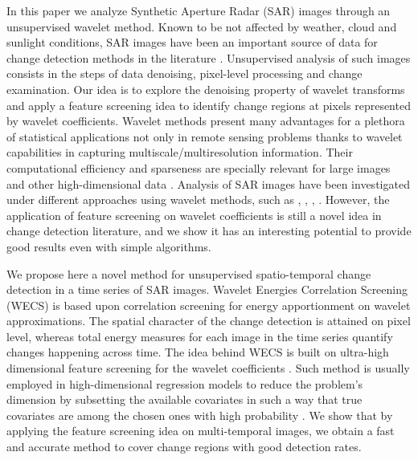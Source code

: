 \documentclass[journal]{IEEEtran}
\begin{document}

In this paper we analyze Synthetic Aperture Radar (SAR) images through an unsupervised wavelet method. Known to be not affected by weather, cloud and sunlight conditions, SAR images have been an important source of data for change detection methods in the literature \cite{bovolo2005detail}. Unsupervised analysis of such images consists in the steps of data denoising, pixel-level processing and change examination. Our idea is to explore the denoising property of wavelet transforms and apply a feature screening idea to identify change regions at pixels represented by wavelet coefficients. Wavelet methods present many advantages for a plethora of statistical applications \cite{vidakovic1999statistical} not only in remote sensing problems thanks to wavelet capabilities in capturing multiscale/multiresolution information. Their computational efficiency and sparseness are specially relevant for large images and other high-dimensional data \cite{morettin2017wavelets}. Analysis of SAR images have been investigated under different approaches using wavelet methods, such as \cite{atto2012multidate}, \cite{bouhlel2015multivariate}, \cite{celik2009multiscale}, \cite{cui2012statistical}. However, the application of feature screening on wavelet coefficients is still a novel idea in change detection literature, and we show it has an interesting potential to provide good results even with simple algorithms.

We propose here a novel method for unsupervised spatio-temporal change detection in a time series of SAR images. Wavelet Energies Correlation Screening (WECS) is based upon correlation screening for energy apportionment on wavelet approximations. The spatial character of the change detection is attained on pixel level, whereas total energy measures for each image in the time series quantify changes happening across time. The idea behind WECS is built on ultra-high dimensional feature screening for the wavelet coefficients \cite{fan2020statistical}. Such method is usually employed in high-dimensional regression models to reduce the problem's dimension by subsetting the available covariates in such a way that true covariates are among the chosen ones with high probability \cite{fan2008sure}. We show that by applying the feature screening idea on multi-temporal images, we obtain a fast and accurate method to cover change regions with good detection rates.
\end{document}
